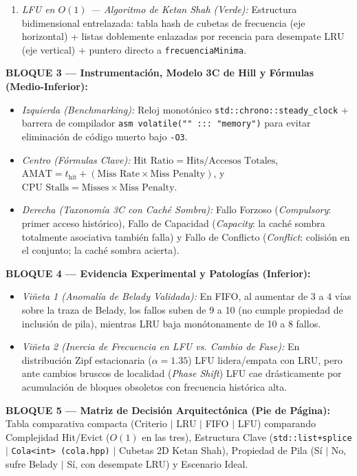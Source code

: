 \documentclass[11pt,letterpaper]{article}
\begin{document}
\begin{tcolorbox}
\begin{enumerate}
    \item \textit{LFU en $O(1)$ — Algoritmo de Ketan Shah (Verde):} Estructura bidimensional entrelazada: tabla hash de cubetas de frecuencia (eje horizontal) + listas doblemente enlazadas por recencia para desempate LRU (eje vertical) + puntero directo a \texttt{frecuenciaMinima}.
\end{enumerate}
\textbf{BLOQUE 3 — Instrumentación, Modelo 3C de Hill y Fórmulas (Medio-Inferior):}
\begin{itemize}
    \item \textit{Izquierda (Benchmarking):} Reloj monotónico \texttt{std::chrono::steady\_clock} + barrera de compilador \texttt{asm volatile("" ::: "memory")} para evitar eliminación de código muerto bajo \texttt{-O3}.
    \item \textit{Centro (Fórmulas Clave):} $\text{Hit Ratio} = \text{Hits}/\text{Accesos Totales}$, $\text{AMAT} = t_{\text{hit}} + (\text{Miss Rate} \times \text{Miss Penalty})$, y $\text{CPU Stalls} = \text{Misses} \times \text{Miss Penalty}$.
    \item \textit{Derecha (Taxonomía 3C con Caché Sombra):} Fallo Forzoso (\textit{Compulsory}: primer acceso histórico), Fallo de Capacidad (\textit{Capacity}: la caché sombra totalmente asociativa también falla) y Fallo de Conflicto (\textit{Conflict}: colisión en el conjunto; la caché sombra acierta).
\end{itemize}
\textbf{BLOQUE 4 — Evidencia Experimental y Patologías (Inferior):}
\begin{itemize}
    \item \textit{Viñeta 1 (Anomalía de Belady Validada):} En FIFO, al aumentar de 3 a 4 vías sobre la traza de Belady, los fallos suben de 9 a 10 (no cumple propiedad de inclusión de pila), mientras LRU baja monótonamente de 10 a 8 fallos.
    \item \textit{Viñeta 2 (Inercia de Frecuencia en LFU vs. Cambio de Fase):} En distribución Zipf estacionaria ($\alpha=1.35$) LFU lidera/empata con LRU, pero ante cambios bruscos de localidad (\textit{Phase Shift}) LFU cae drásticamente por acumulación de bloques obsoletos con frecuencia histórica alta.
\end{itemize}
\textbf{BLOQUE 5 — Matriz de Decisión Arquitectónica (Pie de Página):}
Tabla comparativa compacta (Criterio $\mid$ LRU $\mid$ FIFO $\mid$ LFU) comparando Complejidad Hit/Evict ($O(1)$ en las tres), Estructura Clave (\texttt{std::list+splice} $\mid$ \texttt{Cola<int> (cola.hpp)} $\mid$ Cubetas 2D Ketan Shah), Propiedad de Pila (Sí $\mid$ No, sufre Belady $\mid$ Sí, con desempate LRU) y Escenario Ideal.
\end{tcolorbox}
\end{document}
